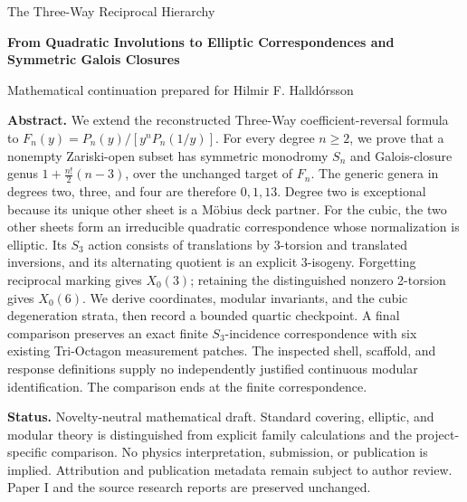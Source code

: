 \documentclass[11pt,a4paper]{article}
\numberwithin{equation}{section}
\begin{document}
\hypersetup{pageanchor=false}
\begin{titlepage}\centering\vspace*{14mm}
{\Large The Three-Way Reciprocal Hierarchy\par}\vspace{7mm}
{\LARGE\bfseries From Quadratic Involutions to Elliptic Correspondences and Symmetric Galois Closures\par}
\vspace{12mm}
{\large Mathematical continuation prepared for Hilmir F. Halldórsson\par}
\vspace{3mm}{with Codex assistance\par}
\vspace{7mm}{Paper II / Version 0.1 / 5 October 2026\par}
\vspace{9mm}
\begin{minipage}{.93\textwidth}
\textbf{Abstract.} We extend the reconstructed Three-Way coefficient-reversal formula to
\(F_n(y)=P_n(y)/[y^nP_n(1/y)]\).
For every degree \(n\ge2\), we prove that a nonempty Zariski-open subset has symmetric monodromy \(S_n\) and Galois-closure genus
\(1+\frac{n!}{2}(n-3)\), over the unchanged target of \(F_n\).
The generic genera in degrees two, three, and four are therefore \(0,1,13\).
Degree two is exceptional because its unique other sheet is a Möbius deck partner. For the cubic, the two other sheets form an irreducible quadratic correspondence whose normalization is elliptic. Its \(S_3\) action consists of translations by 3-torsion and translated inversions, and its alternating quotient is an explicit 3-isogeny. Forgetting reciprocal marking gives \(X_0(3)\); retaining the distinguished nonzero 2-torsion gives \(X_0(6)\). We derive coordinates, modular invariants, and the cubic degeneration strata, then record a bounded quartic checkpoint. A final comparison preserves an exact finite \(S_3\)-incidence correspondence with six existing Tri-Octagon measurement patches. The inspected shell, scaffold, and response definitions supply no independently justified continuous modular identification. The comparison ends at the finite correspondence.
\end{minipage}
\vfill
\begin{minipage}{.93\textwidth}\small
\textbf{Status.} Novelty-neutral mathematical draft. Standard covering, elliptic, and modular theory is distinguished from explicit family calculations and the project-specific comparison. No physics interpretation, submission, or publication is implied. Attribution and publication metadata remain subject to author review. Paper I and the source research reports are preserved unchanged.
\end{minipage}
\end{titlepage}
\hypersetup{pageanchor=true}
{\small\setlength{\parskip}{0pt}\tableofcontents}\clearpage{}






\clearpage\appendix
\clearpage{}

\end{document}
